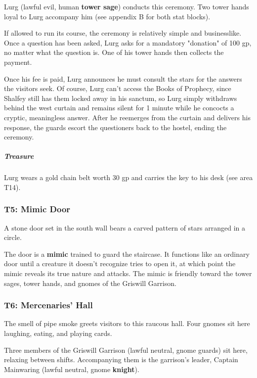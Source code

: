 \documentclass[10pt,a4paper,twoside,bg=print,twocolumn,openany,nodeprecatedcode]{dndbook}
\begin{document}
Lurg (lawful evil, human \textbf{tower sage}) conducts this ceremony. Two tower hands loyal to Lurg accompany him (see appendix B for both stat blocks).

If allowed to run its course, the ceremony is relatively simple and businesslike. Once a question has been asked, Lurg asks for a mandatory "donation" of 100 gp, no matter what the question is. One of his tower hands then collects the payment.

Once his fee is paid, Lurg announces he must consult the stars for the answers the visitors seek. Of course, Lurg can't access the Books of Prophecy, since Shalfey still has them locked away in his sanctum, so Lurg simply withdraws behind the west curtain and remains silent for 1 minute while he concocts a cryptic, meaningless answer. After he reemerges from the curtain and delivers his response, the guards escort the questioners back to the hostel, ending the ceremony.

\subparagraph{Treasure}
Lurg wears a gold chain belt worth 30 gp and carries the key to his desk (see area T14).

\subsubsection{T5: Mimic Door}
\begin{DndReadAloud}{}
A stone door set in the south wall bears a carved pattern of stars arranged in a circle.

\end{DndReadAloud}

The door is a \textbf{mimic} trained to guard the staircase. It functions like an ordinary door until a creature it doesn't recognize tries to open it, at which point the mimic reveals its true nature and attacks. The mimic is friendly toward the tower sages, tower hands, and gnomes of the Griswill Garrison.

\subsubsection{T6: Mercenaries' Hall}
\begin{DndReadAloud}{}
The smell of pipe smoke greets visitors to this raucous hall. Four gnomes sit here laughing, eating, and playing cards.

\end{DndReadAloud}

Three members of the Griswill Garrison (lawful neutral, gnome guards) sit here, relaxing between shifts. Accompanying them is the garrison's leader, Captain Mainwaring (lawful neutral, gnome \textbf{knight}).
\end{document}
